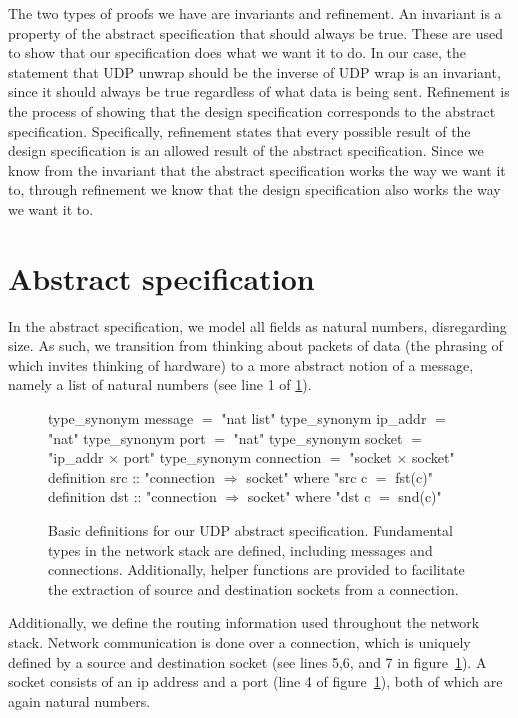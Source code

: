 \documentclass[twoside]{memoir}
\begin{document}
The two types of proofs we have are invariants and refinement.
An invariant is a property of the abstract specification that should always
be true. These are used to show that our specification does what we want it to
do. In our case, the statement that UDP unwrap should be the inverse of UDP wrap
is an invariant,
since it should always be true regardless of what data is being sent.
Refinement is the process of showing that the design specification 
corresponds to the abstract specification.
Specifically, refinement states that every possible result of the design
specification is an allowed result of the abstract specification.
Since we know from the invariant that the abstract specification 
works the way we want it to, through refinement we know
that the design specification also works the way we want it to.


\section{Abstract specification}
In the abstract specification, we model all fields as natural numbers,
disregarding size.
As such, we transition from thinking about packets of data
(the phrasing of which invites thinking of hardware)
to a more abstract notion of a message,
namely a list of natural numbers (see line 1 of \ref{fig:defs-abstract}).

\begin{figure}[htpb]
    \centering
\begin{nlisting}[language=isabelle]
type_synonym message $=$ "nat list"
type_synonym ip_addr $=$ "nat"
type_synonym port $=$ "nat"
type_synonym socket $=$ "ip_addr $\times$ port"
type_synonym connection $=$ "socket $\times$ socket"
definition src :: "connection $\Rightarrow$ socket" where "src c $=$ fst(c)"
definition dst :: "connection $\Rightarrow$ socket" where "dst c $=$ snd(c)"
\end{nlisting}
    \caption{Basic definitions for our UDP abstract specification.
        Fundamental types in the network stack are defined,
        including messages and connections.
        Additionally, helper functions are provided to facilitate 
        the extraction of source and destination sockets from a connection.}
    \label{fig:defs-abstract}
\end{figure}

Additionally, we define the routing information used throughout the
network stack.
Network communication is done over a connection,
which is uniquely defined by a source and destination socket
(see lines 5,6, and 7 in figure~\ref{fig:defs-abstract}).
A socket consists of an ip address and a port (line 4 of figure~\ref{fig:defs-abstract}), both of which are again natural numbers.
\end{document}
